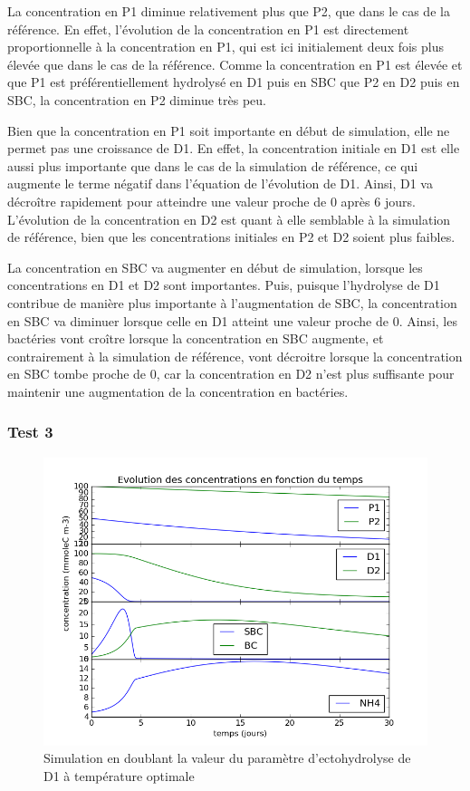 \par{
La concentration en P1 diminue relativement plus que P2, que dans le cas de la r\'ef\'erence. En effet, l'\'evolution de la concentration en P1 est directement proportionnelle \`a la concentration en P1, qui est ici initialement deux fois plus \'elev\'ee que dans le cas de la r\'ef\'erence. Comme la concentration en P1 est \'elev\'ee et que P1 est pr\'ef\'erentiellement hydrolys\'e en D1 puis en SBC que P2 en D2 puis en SBC, la concentration en P2 diminue tr\`es peu.
}
\par{
Bien que la concentration en P1 soit importante en d\'ebut de simulation, elle ne permet pas une croissance de D1. En effet, la concentration initiale en D1 est elle aussi plus importante que dans le cas de la simulation de r\'ef\'erence, ce qui augmente le terme n\'egatif dans l'\'equation de l'\'evolution de D1. Ainsi, D1 va d\'ecro\^itre rapidement pour atteindre une valeur proche de 0 apr\`es 6 jours. L'\'evolution de la concentration en D2 est quant \`a elle semblable \`a la simulation de r\'ef\'erence, bien que les concentrations initiales en P2 et D2 soient plus faibles.
}
\par{
La concentration en SBC va augmenter en d\'ebut de simulation, lorsque les concentrations en D1 et D2 sont importantes. Puis, puisque l'hydrolyse de D1 contribue de mani\`ere plus importante \`a l'augmentation de SBC, la concentration en SBC va diminuer lorsque celle en D1 atteint une valeur proche de 0. Ainsi, les bact\'eries vont cro\^itre lorsque la concentration en SBC augmente, et contrairement \`a la simulation de r\'ef\'erence, vont d\'ecroitre lorsque la concentration en SBC tombe proche de 0, car la concentration en D2 n'est plus suffisante pour maintenir une augmentation de la concentration en bact\'eries.
}

\FloatBarrier
\newpage
\subsubsection{Test 3}

\begin{figure}[h!]
  \includegraphics[width=\textwidth]{partie2/Test3.png}
  \caption{Simulation en doublant la valeur du param\`etre d'ectohydrolyse de D1 \`a temp\'erature optimale 
  }
  \label{fig:partie2test3}
\end{figure}

